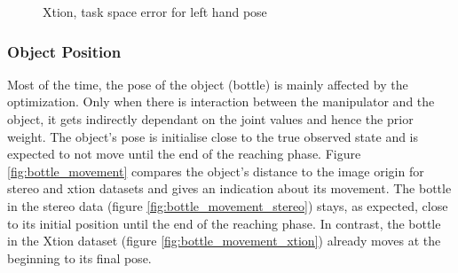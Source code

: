 \begin{figure}
\centering
{}

\caption{Xtion, task space error for left hand pose}
\label{fig:xtion_hand_pose_error}
\end{figure}

\subsubsection{Object Position}

Most of the time, the pose of the object (bottle) is mainly affected by the optimization. Only when there is interaction between the manipulator and the object, it gets indirectly dependant on the joint values and hence the prior weight. The object's pose is initialise close to the true observed state and is expected to not move until the end of the reaching phase. Figure \ref{fig:bottle_movement} compares the object's distance to the image origin for stereo and xtion datasets and gives an indication about its movement. The bottle in the stereo data (figure \ref{fig:bottle_movement_stereo}) stays, as expected, close to its initial position until the end of the reaching phase. In contrast, the bottle in the Xtion dataset (figure \ref{fig:bottle_movement_xtion}) already moves at the beginning to its final pose.

